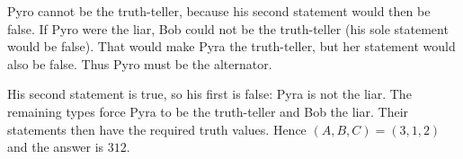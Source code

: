 Pyro cannot be the truth-teller, because his second statement would then be false. If Pyro were the liar, Bob could not be the truth-teller (his sole statement would be false). That would make Pyra the truth-teller, but her statement would also be false. Thus Pyro must be the alternator.

His second statement is true, so his first is false: Pyra is not the liar. The remaining types force Pyra to be the truth-teller and Bob the liar. Their statements then have the required truth values. Hence $(A,B,C)=(3,1,2)$ and the answer is $\boxed{312}$.
